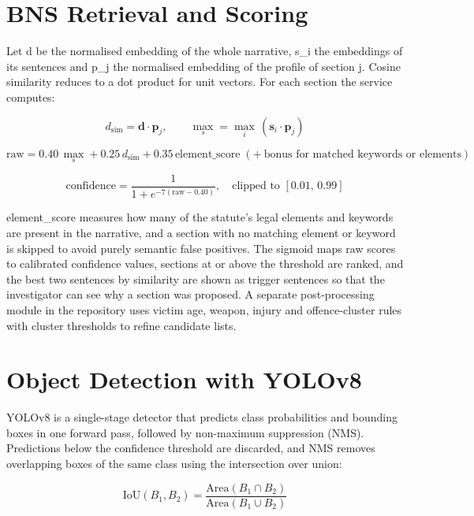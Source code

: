 \documentclass[12pt,a4paper,oneside]{report}
\newcommand{\code}[1]{{\small\ttfamily #1}}
\begin{document}
\section{BNS Retrieval and Scoring}
Let \code{d} be the normalised embedding of the whole narrative, \code{s\_\allowbreak{}i} the embeddings of its sentences and \code{p\_\allowbreak{}j} the normalised embedding of the profile of section \code{j}. Cosine similarity reduces to a dot product for unit vectors. For each section the service computes:

\begin{equation*}
d_{\mathrm{sim}} = \mathbf{d}\cdot \mathbf{p}_j, \qquad \max_s = \max_i\, (\mathbf{s}_i \cdot \mathbf{p}_j)
\end{equation*}

\begin{equation*}
\mathrm{raw} = 0.40\,\max_s + 0.25\,d_{\mathrm{sim}} + 0.35\,\mathrm{element\_score} \;(+\ \text{bonus for matched keywords or elements})
\end{equation*}

\begin{equation*}
\mathrm{confidence} = \frac{1}{1 + e^{-7(\mathrm{raw} - 0.40)}}, \quad \text{clipped to } [0.01,\,0.99]
\end{equation*}

\code{element\_\allowbreak{}score} measures how many of the statute's legal elements and keywords are present in the narrative, and a section with no matching element or keyword is skipped to avoid purely semantic false positives. The sigmoid maps raw scores to calibrated confidence values, sections at or above the threshold are ranked, and the best two sentences by similarity are shown as trigger sentences so that the investigator can see why a section was proposed. A separate post-processing module in the repository uses victim age, weapon, injury and offence-cluster rules with cluster thresholds to refine candidate lists.

\section{Object Detection with YOLOv8}
YOLOv8 is a single-stage detector that predicts class probabilities and bounding boxes in one forward pass, followed by non-maximum suppression (NMS). Predictions below the confidence threshold are discarded, and NMS removes overlapping boxes of the same class using the intersection over union:

\begin{equation*}
\mathrm{IoU}(B_1,B_2) = \frac{\mathrm{Area}(B_1 \cap B_2)}{\mathrm{Area}(B_1 \cup B_2)}
\end{equation*}
\end{document}
